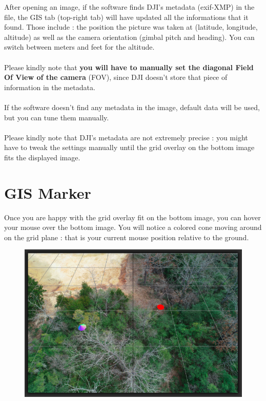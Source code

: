 \documentclass[12pt,a4paper]{article}
\begin{document}
After opening an image, if the software finds DJI's metadata (exif-XMP) in the file, the GIS tab (top-right tab) will have updated all the informations that it found. Those include : the position the picture was taken at (latitude, longitude, altitude) as well as the camera orientation (gimbal pitch and heading). You can switch between meters and feet for the altitude.\\
~\\
Please kindly note that \textbf{you will have to manually set the diagonal Field Of View of the camera} (FOV), since DJI doesn't store that piece of information in the metadata.\\
~\\
If the software doesn't find any metadata in the image, default data will be used, but you can tune them manually.\\
~\\
Please kindly note that DJI's metadata are not extremely precise : you might have to tweak the settings manually until the grid overlay on the bottom image fits the displayed image.

\section{GIS Marker}

Once you are happy with the grid overlay fit on the bottom image, you can hover your mouse over the bottom image. You will notice a colored cone moving around on the grid plane : that is your current mouse position relative to the ground.

\begin{figure}[H]
	\includegraphics[scale=0.4]{grid}
	\centering
\end{figure}
\end{document}
